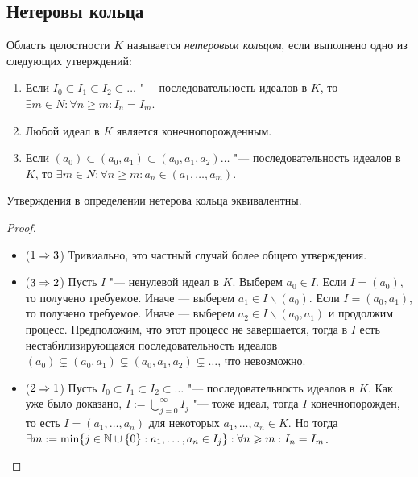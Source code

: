 \subsection{Нетеровы кольца}

\begin{definition}
	Область целостности $K$ называется \textit{нетеровым кольцом}, если выполнено одно из следующих утверждений:
	\begin{enumerate}
		\item Если $I_0 \subset I_1 \subset I_2 \subset \dots$ "--- последовательность идеалов в $K$, то $\exists m \in N: \forall n \ge m: I_n = I_m$.
		\item Любой идеал в $K$ является конечнопорожденным.
		\item Если $(a_0) \subset (a_0, a_1) \subset (a_0, a_1, a_2) \dots$ "--- последовательность идеалов в $K$, то $\exists m \in N: \forall n \ge m: a_n \in (a_1, \dotsc, a_m)$.
	\end{enumerate}
\end{definition}

\begin{proposition}
	Утверждения в определении нетерова кольца эквивалентны.
\end{proposition}

\begin{proof}~
	\begin{itemize}
		\item($1 \Rightarrow 3$) Тривиально, это частный случай более общего утверждения.
		\item($3 \Rightarrow 2$) Пусть $I$ "--- ненулевой идеал в $K$. Выберем $a_0 \in I$. Если $I = (a_0)$, то получено требуемое. Иначе --- выберем $a_1 \in I \backslash (a_0)$. Если $I = (a_0, a_1)$, то получено требуемое. Иначе --- выберем $a_2 \in I \backslash (a_0, a_1)$ и продолжим процесс. Предположим, что этот процесс не завершается, тогда в $I$ есть нестабилизирующаяся последовательность идеалов $(a_0) \subsetneq (a_0, a_1) \subsetneq (a_0, a_1, a_2) \subsetneq \dotsc$, что невозможно.
		\item($2 \Rightarrow 1$) Пусть $I_0 \subset I_1 \subset I_2 \subset \dots$ "--- последовательность идеалов в $K$. Как уже было доказано, $I := \bigcup_{j = 0}^\infty I_j$ "--- тоже идеал, тогда $I$ конечнопорожден, то есть $I = (a_1, \dotsc, a_n)$ для некоторых $a_1, \dotsc, a_n \in K$. Но тогда $\exists m := \min\{j \in \mathbb{N} \cup \{0\} : a_1, \dotsc, a_n \in I_j\}: \forall n \geqslant m: I_n = I_m$.\qedhere
	\end{itemize}
\end{proof}

